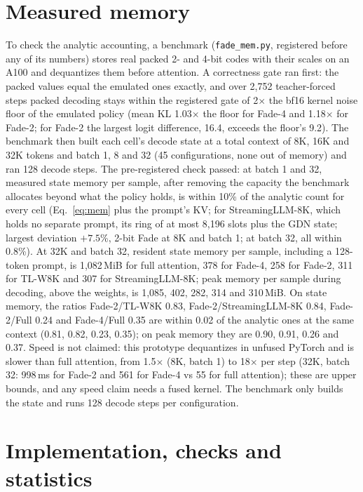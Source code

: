 \documentclass{article}
\begin{document}
\section{Measured memory}
\label{app:mem}
To check the analytic accounting, a benchmark (\texttt{fade\_mem.py}, registered before any of its numbers) stores real packed 2- and 4-bit codes with their scales on an A100 and dequantizes them before attention. A correctness gate ran first: the packed values equal the emulated ones exactly, and over 2,752 teacher-forced steps packed decoding stays within the registered gate of 2$\times$ the bf16 kernel noise floor of the emulated policy (mean KL 1.03$\times$ the floor for Fade-4 and 1.18$\times$ for Fade-2; for Fade-2 the largest logit difference, 16.4, exceeds the floor's 9.2). The benchmark then built each cell's decode state at a total context of 8K, 16K and 32K tokens and batch 1, 8 and 32 (45 configurations, none out of memory) and ran 128 decode steps. The pre-registered check passed: at batch 1 and 32, measured state memory per sample, after removing the capacity the benchmark allocates beyond what the policy holds, is within 10\% of the analytic count for every cell (Eq.~\ref{eq:mem} plus the prompt's KV; for StreamingLLM-8K, which holds no separate prompt, its ring of at most 8,196 slots plus the GDN state; largest deviation $+7.5$\%, 2-bit Fade at 8K and batch 1; at batch 32, all within 0.8\%). At 32K and batch 32, resident state memory per sample, including a 128-token prompt, is 1,082\,MiB for full attention, 378 for Fade-4, 258 for Fade-2, 311 for TL-W8K and 307 for StreamingLLM-8K; peak memory per sample during decoding, above the weights, is 1,085, 402, 282, 314 and 310\,MiB. On state memory, the ratios Fade-2/TL-W8K 0.83, Fade-2/StreamingLLM-8K 0.84, Fade-2/Full 0.24 and Fade-4/Full 0.35 are within 0.02 of the analytic ones at the same context (0.81, 0.82, 0.23, 0.35); on peak memory they are 0.90, 0.91, 0.26 and 0.37. Speed is not claimed: this prototype dequantizes in unfused PyTorch and is slower than full attention, from 1.5$\times$ (8K, batch 1) to 18$\times$ per step (32K, batch 32: 998\,ms for Fade-2 and 561 for Fade-4 vs 55 for full attention); these are upper bounds, and any speed claim needs a fused kernel. The benchmark only builds the state and runs 128 decode steps per configuration.

\section{Implementation, checks and statistics}
\label{app:impl}
\end{document}
